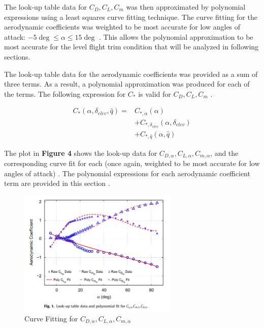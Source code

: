\documentclass[%
 reprint,
 amsmath,amssymb,
 aps,
]{revtex4-2}
\begin{document}
The look-up table data for $C_D, C_L, C_m$ was then approximated by polynomial expressions using a least squares curve fitting technique. The curve fitting for the aerodynamic coefficients was weighted to be most accurate for low angles of attack: $-5\deg \leq \alpha \leq 15\deg$ \cite{primary}. This allows the polynomial approximation to be most accurate for the level flight trim condition that will be analyzed in following sections. 

The look-up table data for the aerodynamic coefficients was provided as a sum of three terms. As a result, a polynomial approximation was produced for each of the terms. The following expression for $C_*$ is valid for $C_D,C_L,C_m$ \cite{primary}.

\begin{align*}
        C_*(\alpha, \delta_{elev}, \hat{q}) = 
        &C_{*,\alpha}(\alpha) \\
        &+ C_{*,\delta_{elev}}(\alpha, \delta_{elev}) \\
        &+ C_{*,\hat{q}}(\alpha,\hat{q}) \tag{20}
\end{align*}

The plot in \textbf{Figure 4} shows the look-up data for $C_{D,\alpha}, C_{L,\alpha}, C_{m,\alpha}$, and the corresponding curve fit for each (once again, weighted to be most accurate for low angles of attack) \cite{primary}. The polynomial expressions for each aerodynamic coefficient term are provided in this section \cite{primary}.

\begin{figure}
    \centering
    \includegraphics[width=3in]{fig1_published.png}
    \caption{Curve Fitting for $C_{D,\alpha}, C_{L,\alpha}, C_{m,\alpha}$ \cite{primary}}
    \label{fig:my_label}
\end{figure}
\end{document}
